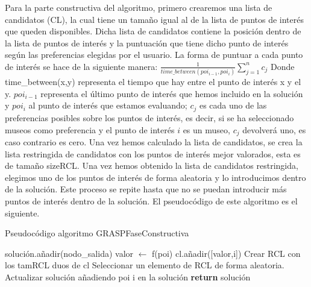\vspace{0.06in}
Para la parte constructiva del algoritmo, primero crearemos una lista de candidatos (CL), la cual tiene un tamaño igual al de la lista de puntos de interés que queden disponibles. Dicha lista de candidatos contiene la posición dentro de la lista de puntos de interés y la puntuación que tiene dicho punto de interés según las preferencias elegidas por el usuario. La forma de puntuar a cada punto de interés se hace de la siguiente manera:\newline
$ \frac{1}{time\_between(poi_{i-1},poi_i)}\sum_{j=1}^{n}c_j$ \newline
Donde time\_between(x,y) representa el tiempo que hay entre el punto de interés x y el y. $poi_{i-1}$ representa el último punto de interés que hemos incluido en la solución y $poi_i$ al punto de interés que estamos evaluando; $c_j$ es cada uno de las preferencias posibles sobre los puntos de interés, es decir, si se ha seleccionado museos como preferencia y el punto de interés $i$ es un museo, $c_j$ devolverá uno, es caso contrario es cero.\newline
Una vez hemos calculado la lista de candidatos, se crea la lista restringida de candidatos con los puntos de interés mejor valorados, esta es de tamaño sizeRCL. Una vez hemos obtenido la lista de candidatos restringida, elegimos uno de los puntos de interés de forma aleatoria y lo introducimos dentro de la solución. Este proceso se repite hasta que no se puedan introducir más puntos de interés dentro de la solución. El pseudocódigo de este algoritmo es el siguiente.\newline
\vspace{0.06in}
\begin{algorithm}
	\caption{Pseudocódigo algoritmo GRASPFaseConstructiva}
	\label{alg:grasp_contruct}
	\begin{algorithmic}
		\State solución.añadir(nodo\_salida)
				\State valor $\gets$ f(poi)
				\State cl.añadir([valor,i])
			\EndFor
			\State Crear RCL con los tamRCL duos de cl
			\State Seleccionar un elemento de RCL de forma aleatoria.
			\State Actualizar solución añadiendo poi i en la solución
		\EndWhile
		\State \textbf{return} solución
		\EndFunction
	\end{algorithmic}
\end{algorithm}

